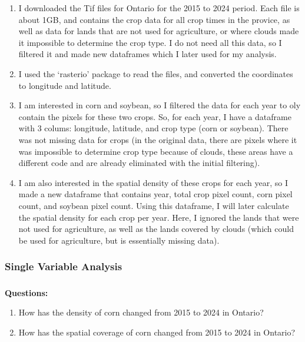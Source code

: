 \documentclass[
  11pt,
  letterpaper,
  DIV=11,
  numbers=noendperiod]{scrartcl}
\makeatletter
\let\oldsubparagraph\subparagraph
\renewcommand{\subparagraph}{
    \@ifstar
      \xxxSubParagraphStar
      \xxxSubParagraphNoStar
  }
\newcommand{\xxxSubParagraphStar}[1]{\oldsubparagraph*{#1}\mbox{}}
\newcommand{\xxxSubParagraphNoStar}[1]{\oldsubparagraph{#1}\mbox{}}
\providecommand{\tightlist}{%
  \setlength{\itemsep}{0pt}\setlength{\parskip}{0pt}}
\makeatother
\begin{document}
\begin{enumerate}
\def\labelenumi{\arabic{enumi}.}
\tightlist
\item
  I downloaded the Tif files for Ontario for the 2015 to 2024 period.
  Each file is about 1GB, and contains the crop data for all crop times
  in the provice, as well as data for lands that are not used for
  agriculture, or where clouds made it impossible to determine the crop
  type. I do not need all this data, so I filtered it and made new
  dataframes which I later used for my analysis.
\item
  I used the `rasterio' package to read the files, and converted the
  coordinates to longitude and latitude.
\item
  I am interested in corn and soybean, so I filtered the data for each
  year to oly contain the pixels for these two crops. So, for each year,
  I have a dataframe with 3 colums: longitude, latitude, and crop type
  (corn or soybean). There was not missing data for crops (in the
  original data, there are pixels where it was impossible to determine
  crop type because of clouds, these areas have a different code and are
  already eliminated with the initial filtering).
\item
  I am also interested in the spatial density of these crops for each
  year, so I made a new dataframe that contains year, total crop pixel
  count, corn pixel count, and soybean pixel count. Using this
  dataframe, I will later calculate the spatial density for each crop
  per year. Here, I ignored the lands that were not used for
  agriculture, as well as the lands covered by clouds (which could be
  used for agriculture, but is essentially missing data).
\end{enumerate}

\subsubsection{Single Variable Analysis}\label{single-variable-analysis}

\subparagraph{\texorpdfstring{\textbf{Questions:}}{Questions:}}\label{questions}

\begin{enumerate}
\def\labelenumi{\arabic{enumi}.}
\tightlist
\item
  How has the density of corn changed from 2015 to 2024 in Ontario?
\item
  How has the spatial coverage of corn changed from 2015 to 2024 in
  Ontario?
\end{enumerate}
\end{document}
